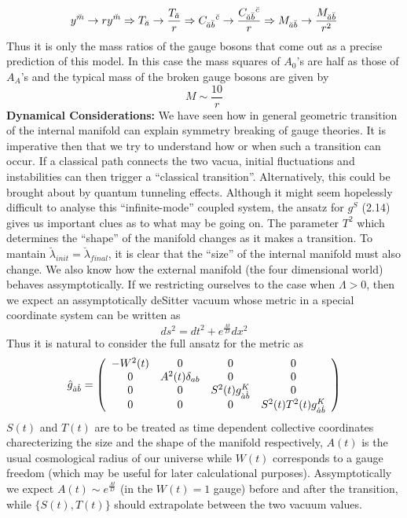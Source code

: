 \documentclass[a4paper,12pt]{article}
\begin{document}
$$y^{\breve{m}}\rightarrow ry^{\breve{m}}\Rightarrow T_{\breve{a}}\rightarrow \frac{T_{\breve{a}}}{r}\Rightarrow C_{\breve{a}\breve{b}}{}^{\breve{c}}\rightarrow \frac{C_{\breve{a}\breve{b}}{}^{\breve{c}}}{r}\Rightarrow M_{\breve{a}\breve{b}}\rightarrow \frac{M_{\breve{a}\breve{b}}}{r^2}$$
Thus it is only the mass ratios of the gauge bosons that come out as a precise prediction of this model. In this case the mass squares  of $A_{0}$'s are half as those of $A_{A}$'s and the typical mass of the broken gauge bosons are given by
$$ M\sim \frac{10}{r}$$
{\bf Dynamical Considerations:}  We have seen  how in general geometric transition of the internal manifold can explain symmetry breaking of gauge theories. It is imperative then that we try to understand how or when such a transition can occur. If a classical path connects the two vacua, initial fluctuations and instabilities can then trigger a ``classical transition''. Alternatively, this could be brought about by  quantum tunneling effects. Although it might seem hopelessly difficult to analyse this ``infinite-mode'' coupled system, the ansatz for $g^S$ (2.14) gives us important clues as to what may be going on. The parameter $T^2$ which determines the ``shape'' of the manifold changes as it makes a transition. To mantain $\breve{\lambda}_{init}=\breve{\lambda}_{final}$, it is clear that the ``size'' of the internal manifold must also change. We also know how the external manifold (the four dimensional world) behaves assymptotically. If we restricting ourselves to the case when $\Lambda >0$,  then we expect an assymptotically deSitter vacuum whose metric in a special coordinate system can be written as
$$ds^2=dt^2+e^{\frac{\Lambda t}{D}}dx^2$$
Thus it is natural to consider the full ansatz for the metric as
\begin{equation}
\hat{g}_{\hat{a}\hat{b}}= \left( \begin{array}{cccc}
-W^2(t) & 0       & 0 & 0\\
0  & A^2(t)\delta_{ab} & 0 & 0\\
0  & 0       & S^2(t) g^K_{\grave{a}\grave{b}} & 0\\
0  & 0       & 0                      &S^2(t) T^2(t) g^K_{\dot{a}\dot{b}}
\end{array} \right)
\end{equation}
$S(t)$ and $T(t)$ are to be treated as time dependent collective coordinates charecterizing the size and the shape  of the manifold respectively, $A(t)$ is the usual cosmological radius of our universe while $W(t)$ corresponds to a gauge freedom (which may be useful for later calculational purposes).
Assymptotically we expect $A(t) \sim e^{\frac{\Lambda t}{D}}$ (in the $W(t)=1$ gauge) before and after the transition, while $\{ S(t),T(t)\}$ should extrapolate between the two vacuum values. 
\end{document}

